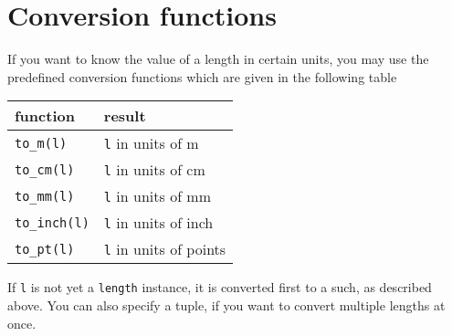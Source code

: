 \section{Conversion functions}
If you want to know the value of a \PyX{} length in certain units, you
may use the predefined conversion functions which are given in the
following table
\begin{center}
\begin{tabular}{ll}
function & result \\
\hline
\texttt{to\_m(l)} & \texttt{l} in units of m\\
\texttt{to\_cm(l)} & \texttt{l} in units of cm\\
\texttt{to\_mm(l)} & \texttt{l} in units of mm\\
\texttt{to\_inch(l)} & \texttt{l} in units of inch\\
\texttt{to\_pt(l)} & \texttt{l} in units of points\\
\end{tabular}
\end{center}
If \verb|l| is not yet a \verb|length| instance, it is converted first
to a such, as described above. You can also specify a tuple, if you
want to convert multiple lengths at once.








